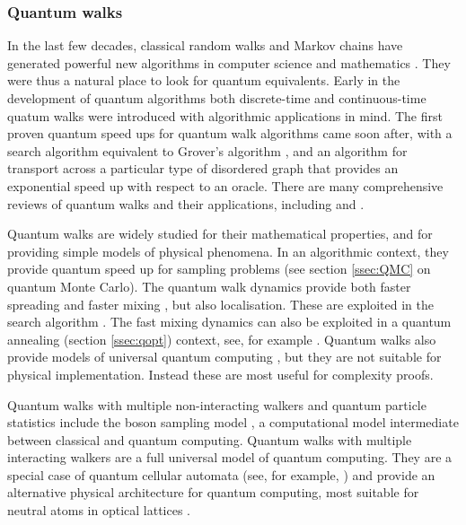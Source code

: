 \documentclass[10pt]{iopart}
\begin{document}
\subsubsection{Quantum walks}\label{sssec:qw}\hfill

In the last few decades, classical random walks and Markov chains have generated powerful new algorithms in computer science and mathematics \cite{Motwani1995}. They were thus a natural place to look for quantum equivalents. Early in the development of quantum algorithms both discrete-time \cite{Aharonov2000,Ambainis2001} and continuous-time quatum walks \cite{Farhi1998} were introduced with algorithmic applications in mind.  The first proven quantum speed ups for quantum walk algorithms came soon after, with a search algorithm \cite{Shenvi2002} equivalent to Grover's algorithm \cite{Grover1996}, and an algorithm for transport across a particular type of disordered graph \cite{Childs2003b} that provides an exponential speed up with respect to an oracle.  
There are many comprehensive reviews of quantum walks and their applications, including \cite{VenegasAndraca2012} and \cite{Kadian2021}.

Quantum walks are widely studied for their mathematical properties, and for providing simple models of physical phenomena.  In an algorithmic context, they provide quantum speed up for sampling problems (see section \ref{ssec:QMC} on quantum Monte Carlo).  The quantum walk dynamics provide both faster spreading \cite{Ambainis2001} and faster mixing \cite{Aharonov2000}, but also localisation. These are exploited in the search algorithm \cite{Shenvi2002}.  The fast mixing dynamics can also be exploited in a quantum annealing (section \ref{ssec:qopt}) context, see, for example \cite{Callison2019}.  Quantum walks also provide models of universal quantum computing \cite{Childs2009, Lovett2010}, but they are not suitable for physical implementation. Instead these are most useful for complexity proofs.  

Quantum walks with multiple non-interacting walkers and quantum particle statistics include the boson sampling model \cite{Aaronson2011}, a computational model intermediate between classical and quantum computing.
Quantum walks with multiple interacting walkers \cite{Aaronson2011} are a full universal model of quantum computing.  They are a special case of quantum cellular automata (see, for example, \cite{Schumacher2004}) and provide an alternative physical architecture for quantum computing, most suitable for neutral atoms in optical lattices \cite{Karski2009}.
\end{document}
